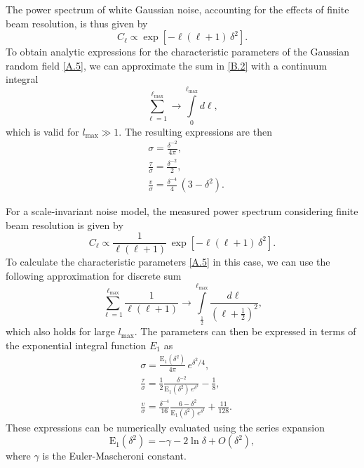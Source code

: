 \documentclass{aa}
\begin{document}
The power spectrum of white Gaussian noise, accounting for the effects of finite beam resolution, is thus given by
%
\begin{equation}
    C_\ell \propto \exp\left[-\ell(\ell+1)\, \delta^2\right] .
\end{equation}
%
To obtain analytic expressions for the characteristic parameters of the Gaussian random field \eqref{A.5}, we can approximate the sum in \eqref{B.2} with a continuum integral
%
\begin{equation}
\sum_{\ell=1}^{\ell_{\text{max}}} \to \int\limits_{0}^{\ell_{\text{max}}}d{\ell} ,
\end{equation}
%
which is valid for $l_{\text{max}}\gg 1$. The resulting expressions are then
%
\begin{equation}
\begin{aligned}
&\sigma = \frac{\delta^{-2}}{4\pi}, \\
&\frac{\tau}{\sigma} =  \frac{\delta^{-2}}{2}, \\
&\frac{v}{\sigma} = \frac{\delta^{-4}}{4}\, (3-\delta^2).
\end{aligned}
\end{equation}

For a scale-invariant noise model, the measured power spectrum considering finite beam resolution is given by 
%
\begin{equation}
  C_{\ell} \propto \frac{1}{\ell(\ell+1)}\, \exp\left[-\ell(\ell+1)\, \delta^2\right] .
\end{equation}
%
To calculate the characteristic parameters \eqref{A.5} in this case, we can use the following approximation for discrete sum
%
\begin{equation}
  \sum\limits_{\ell=1}^{\ell_{\text{max}}} \frac{1}{\ell(\ell+1)} \to
  \int\limits_{\frac{1}{2}}^{\ell_{\text{max}}} \frac{d\ell}{(\ell+\frac{1}{2})^2} ,
\end{equation}
%
which also holds for large $l_{\text{max}}$. The parameters can then be expressed in terms of the exponential integral function $E_{1}$ as
%
\begin{equation}
\begin{aligned}
&\sigma = \frac{\textrm{E}_{1}(\delta^2)}{4\pi}\, e^{\delta^2/4}, \\
&\frac{\tau}{\sigma} = \frac{1}{2}\frac{\delta^{-2}}{\textrm{E}_{1}(\delta^2)\, e^{\delta^2}} - \frac{1}{8}, \\
&\frac{v}{\sigma} = \frac{\delta^{-4}}{16}\frac{6 - \delta^{2}}{\textrm{E}_{1}(\delta^2)\, e^{\delta^2}} + \frac{11}{128}.
\end{aligned}
\end{equation}
%
These expressions can be numerically evaluated using the series expansion
%
\begin{equation}
  \textrm{E}_{1}(\delta^2) = -\gamma - 2\ln\delta + O(\delta^2),
\end{equation}
%
where $\gamma$ is the Euler-Mascheroni constant.
\end{document}
